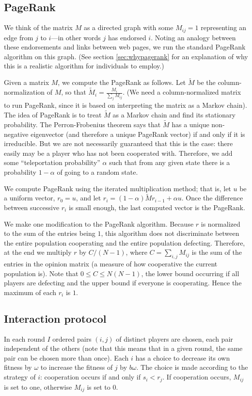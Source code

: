 \documentclass{amsart}
\begin{document}
\subsection{PageRank}
\newcommand{\tM}{\tilde M} We think of the matrix $M$ as a directed
graph with some $M_{ij} = 1$ representing an edge from $j$ to $i$---in
other words $j$ has endorsed $i$. Noting an analogy between these
endorsements and links between web pages, we run the standard PageRank
algorithm \cite{page_pagerank_1999} on this graph. (See section
\ref{sec:whypagerank} for an explanation of why this is a realistic
algorithm for individuals to employ.)

Given a matrix $M$, we compute the PageRank as follows. Let $\tM$ be
the column-normalization of $M$, so that $\tM_i = \frac{M_i}{\sum_j
  M_{ij}}$. (We need a column-normalized matrix to run PageRank, since
it is based on interpreting the matrix as a Markov chain). The idea
of PageRank is to treat $\tM$ as a Markov chain and find its
stationary probability. The Perron-Frobenius theorem says that $\tM$
has a unique non-negative eigenvector (and therefore a unique PageRank
vector) if and only if it is irreducible. But we are not necessarily
guaranteed that this is the case: there easily may be a player who has
not been cooperated with. Therefore, we add some ``teleportation
probability'' $\alpha$ such that from any given state there is a
probability $1-\alpha$ of going to a random state.

We compute PageRank using the iterated multiplication method; that is,
let $u$ be a uniform vector, $r_0 = u$, and let $r_i =
(1-\alpha)\tilde M r_{i-1} + \alpha u$. Once the difference between
successive $r_i$ is small enough, the last computed vector is the
PageRank.

We make one modification to the PageRank algorithm. Because $r$ is
normalized to the sum of the entries being $1$, this algorithm does
not discriminate between the entire population cooperating and the
entire population defecting. Therefore, at the end we multiply $r$ by
$C/(N-1)$, where $C = \sum_{i,j} M_{ij}$ is the sum of the entries in
the opinion matrix (a measure of how cooperative the current
population is). Note that $0 \le C \le N(N-1)$, the lower bound
occurring if all players are defecting and the upper bound if everyone
is cooperating. Hence the maximum of each $r_i$ is $1$.

\subsection{Interaction protocol}
In each round $I$ ordered pairs $(i,j)$ of distinct players are
chosen, each pair independent of the others (note that this means that
in a given round, the same pair can be chosen more than once). Each
$i$ has a choice to decrease its own fitness by $\omega$ to increase
the fitness of $j$ by $b \omega$. The choice is made according to the
strategy of $i$: cooperation occurs if and only if $s_i < r_j$. If
cooperation occurs, $M_{ij}$ is set to one, otherwise $M_{ij}$ is set
to $0$.
\end{document}
